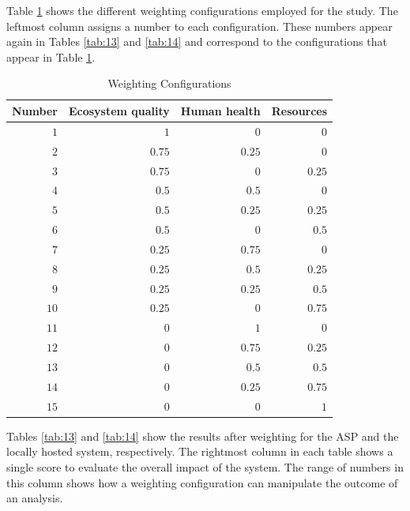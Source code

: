 \documentclass[final,journal,10pt,letterpaper,oneside,twocolumn,compsoc]%
{IEEEtran}
\begin{document}
Table \ref{tab:12} shows the different weighting configurations employed for the
study.
The leftmost column assigns a number to each configuration. These
numbers appear again in Tables \ref{tab:13} and \ref{tab:14} and correspond to
the configurations that appear in Table \ref{tab:12}.

\begin{table}[t!]
  \caption{Weighting Configurations}
  \label{tab:12}
  \centering
    \begin{tabular}{| r | r | r | r |}
      \hline
      Number & Ecosystem quality & Human health & Resources \\
      \hline
      $1$  & $1$    & $0$    & $0$    \\
      $2$  & $0.75$ & $0.25$ & $0$    \\
      $3$  & $0.75$ & $0$    & $0.25$ \\
      $4$  & $0.5$  & $0.5$  & $0$    \\
      $5$  & $0.5$  & $0.25$ & $0.25$ \\
      $6$  & $0.5$  & $0$    & $0.5$  \\
      $7$  & $0.25$ & $0.75$ & $0$    \\
      $8$  & $0.25$ & $0.5$  & $0.25$ \\
      $9$  & $0.25$ & $0.25$ & $0.5$  \\
      $10$ & $0.25$ & $0$    & $0.75$ \\
      $11$ & $0$    & $1$    & $0$    \\
      $12$ & $0$    & $0.75$ & $0.25$ \\
      $13$ & $0$    & $0.5$  & $0.5$  \\
      $14$ & $0$    & $0.25$ & $0.75$ \\
      $15$ & $0$    & $0$    & $1$    \\
      \hline
    \end{tabular}
\end{table}

Tables \ref{tab:13} and \ref{tab:14} show the results after weighting for the ASP and the locally
hosted system, respectively. The rightmost column in each table shows a single
score to
evaluate the overall impact of the system. The range of numbers in this column
shows how a weighting configuration can manipulate the outcome of an analysis.
\end{document}
